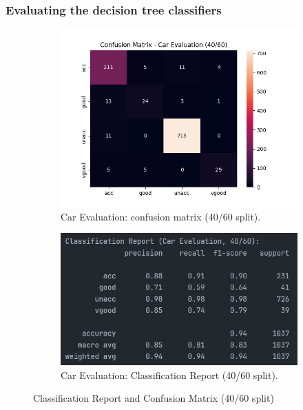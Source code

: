 \subsubsection*{Evaluating the decision tree classifiers}
\begin{figure}[H]
	\centering
	\begin{subfigure}{0.45\textwidth}
		\centering
		\includegraphics[width=\textwidth]{imgs/confusion_mat/confusion_mat__car_evaluation__40_vs_60.png}
		\caption{Car Evaluation: confusion matrix (40/60 split).}\label{fig:ce-cm-40-60}
	\end{subfigure}
	\hfill
	\begin{subfigure}{0.45\textwidth}
		\centering
		\includegraphics[width=\textwidth]{imgs/confusion_mat/class_rp__car_evaluation__40_vs_60.png}
		\caption{Car Evaluation: Classification Report (40/60 split).}\label{fig:ce-cr-40-60}
	\end{subfigure}

	\caption{Classification Report and Confusion Matrix (40/60 split)}\label{fig:ce-eval-40-60}
\end{figure}
